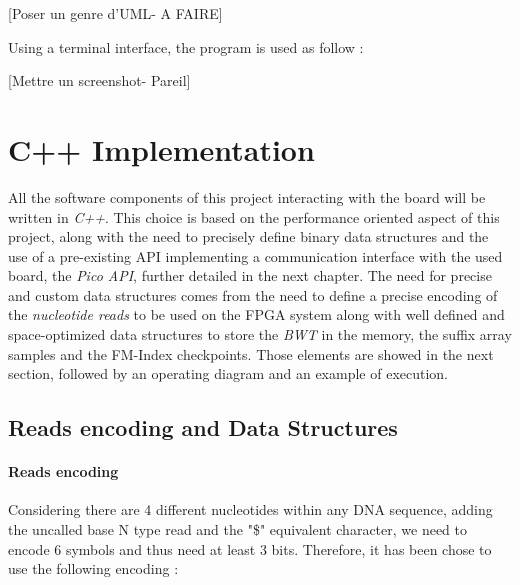 [Poser un genre d'UML- A FAIRE]

Using a terminal interface, the program is used as follow : 

[Mettre un screenshot- Pareil]

\section{C++ Implementation}

All the software components of this project interacting with the board will be written in \textsl{C++}. This choice is based on the performance oriented aspect of this project, along with the need to precisely define binary data structures and the use of a pre-existing API implementing a communication interface with the used board, the \textit{Pico API}, further detailed in the next chapter. The need for precise and custom data structures comes from the need to define a precise encoding of the \textsl{nucleotide reads} to be used on the FPGA system along with well defined and space-optimized data structures to store the \textsl{BWT} in the memory, the suffix array samples and the FM-Index checkpoints. Those elements are showed in the next section, followed by an operating diagram and an example of execution.

\subsection{Reads encoding and Data Structures}

\paragraph{Reads encoding}

Considering there are 4 different nucleotides within any DNA sequence, adding the uncalled base N type read and the "\$" equivalent character, we need to encode 6 symbols and thus need at least 3 bits. Therefore, it has been chose to use the following encoding : \\

